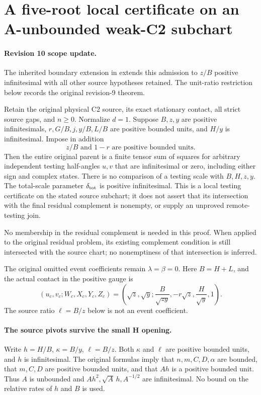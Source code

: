 \section{A five-root local certificate on an A-unbounded weak-C2 subchart}
\label{sec:r9-weak-A-five-root}

\paragraph{Revision 10 scope update.}
The inherited boundary extension in  extends this admission to $z/B$
positive infinitesimal with all other source hypotheses retained.
The unit-ratio restriction below records the original revision-9 theorem.

\begin{theorem}
Retain the original physical C2 source, its exact stationary contact,
all strict source gaps, and $n\ge0$.
Normalize $d=1$. Suppose $B,z,y$ are positive infinitesimals,
$r,G/B,j,y/B,L/B$ are positive bounded units, and $H/y$ is
infinitesimal. Impose in addition
\[
 z/B\text{ and }1-r\text{ are positive bounded units}.       \tag{WA1}
\]
Then the entire original parent is a finite tensor sum of squares
for arbitrary independent testing half-angles $u,v$ that are
infinitesimal or zero, including either sign and complex states.
There is no comparison of a testing scale with $B,H,z,y$.
The total-scale parameter $\delta_{\rm tot}$ is positive infinitesimal.
This is a local testing certificate on the stated source subchart;
it does not assert that its intersection with the final residual
complement is nonempty, or supply an unproved remote-testing join.
\end{theorem}

No membership in the residual complement is needed in this proof.
When applied to the original residual problem, its existing complement
condition is still intersected with the source chart; no nonemptiness
of that intersection is inferred.

The original omitted event coefficients remain $\lambda=\beta=0$.
Here $B=H+L$, and the actual contact in the positive gauge is
\[
 (u_c,v_c;W_c,X_c,Y_c,Z_c)
 =\left(\sqrt z,\sqrt y;\frac B{\sqrt{zy}},
                  -r\sqrt z,\frac H{\sqrt y},1\right).
\]
The source ratio $\ell=B/z$ below is not an event coefficient.

\paragraph{The source pivots survive the small H opening.}
Write $h=H/B$, $\kappa=B/y$, $\ell=B/z$. Both $\kappa$ and
$\ell$ are positive bounded units, and $h$ is infinitesimal.
The original formulas imply that $n,m,C,D,\alpha$ are bounded,
that $m,C,D$ are positive bounded units, and that $Ah$ is a
positive bounded unit. Thus $A$ is unbounded and
$Ah^2,\sqrt A\,h,A^{-1/2}$ are infinitesimal. No bound on the
relative rates of $h$ and $B$ is used.

